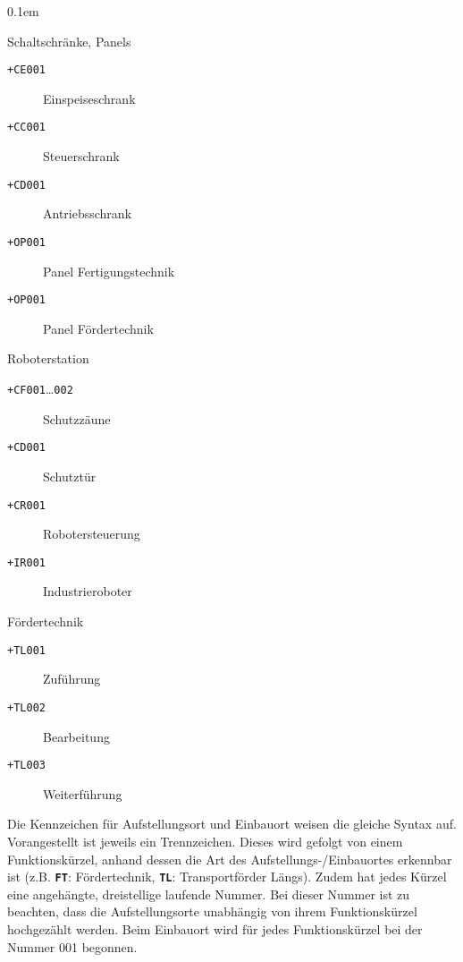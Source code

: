 \begin{description}
  \itemsep0.1em
  \item[\texttt{++ST000}] Schaltschränke, Panels
  \begin{description}
    \item [\texttt{+CE001}] Einspeiseschrank
    \item [\texttt{+CC001}] Steuerschrank
    \item [\texttt{+CD001}] Antriebsschrank
    \item [\texttt{+OP001}] Panel Fertigungstechnik
    \item [\texttt{+OP001}] Panel Fördertechnik
  \end{description}
  \item[\texttt{++ST001}] Roboterstation
  \begin{description}
    \item [\texttt{+CF001}\ldots\texttt{002}] Schutzzäune
    \item [\texttt{+CD001}] Schutztür
    \item [\texttt{+CR001}] Robotersteuerung
    \item [\texttt{+IR001}] Industrieroboter
  \end{description}
  \item[\texttt{++FT002}] Fördertechnik
  \begin{description}
    \item [\texttt{+TL001}] Zuführung
    \item [\texttt{+TL002}] Bearbeitung
    \item [\texttt{+TL003}] Weiterführung
  \end{description}
\end{description}

Die Kennzeichen für Aufstellungsort und Einbauort weisen die gleiche Syntax auf. Vorangestellt ist jeweils ein Trennzeichen. Dieses wird gefolgt von einem Funktionskürzel, anhand dessen die Art des Aufstellungs-/Einbauortes erkennbar ist (z.B. \texttt{\textbf{FT}}: Fördertechnik, \texttt{\textbf{TL}}: Transportförder Längs). Zudem hat jedes Kürzel eine angehängte, dreistellige laufende Nummer. Bei dieser Nummer ist zu beachten, dass die Aufstellungsorte unabhängig von ihrem Funktionskürzel hochgezählt werden. Beim Einbauort wird für jedes Funktionskürzel bei der Nummer 001 begonnen.


